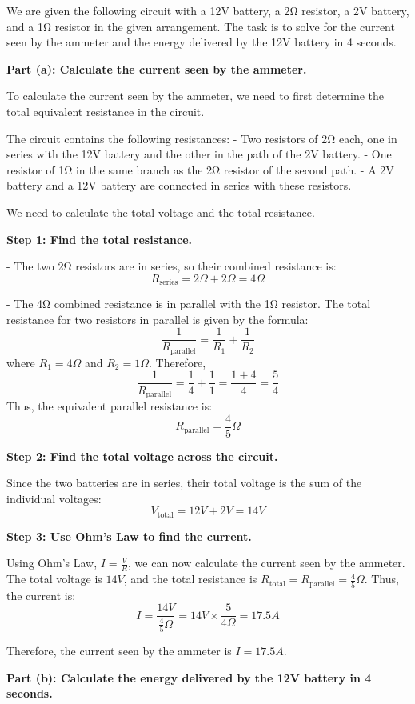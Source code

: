 \documentclass{article}
\begin{document}
We are given the following circuit with a 12V battery, a 2Ω resistor, a 2V battery, and a 1Ω resistor in the given arrangement. The task is to solve for the current seen by the ammeter and the energy delivered by the 12V battery in 4 seconds.

\textbf{Part (a): Calculate the current seen by the ammeter.}

To calculate the current seen by the ammeter, we need to first determine the total equivalent resistance in the circuit.

The circuit contains the following resistances:
- Two resistors of 2Ω each, one in series with the 12V battery and the other in the path of the 2V battery.
- One resistor of 1Ω in the same branch as the 2Ω resistor of the second path.
- A 2V battery and a 12V battery are connected in series with these resistors.

We need to calculate the total voltage and the total resistance.

\textbf{Step 1: Find the total resistance.}

- The two 2Ω resistors are in series, so their combined resistance is:
  \[
  R_{\text{series}} = 2Ω + 2Ω = 4Ω
  \]

- The 4Ω combined resistance is in parallel with the 1Ω resistor. The total resistance for two resistors in parallel is given by the formula:
  \[
  \frac{1}{R_{\text{parallel}}} = \frac{1}{R_1} + \frac{1}{R_2}
  \]
  where \(R_1 = 4Ω\) and \(R_2 = 1Ω\). Therefore,
  \[
  \frac{1}{R_{\text{parallel}}} = \frac{1}{4} + \frac{1}{1} = \frac{1 + 4}{4} = \frac{5}{4}
  \]
  Thus, the equivalent parallel resistance is:
  \[
  R_{\text{parallel}} = \frac{4}{5}Ω
  \]

\textbf{Step 2: Find the total voltage across the circuit.}

Since the two batteries are in series, their total voltage is the sum of the individual voltages:
\[
V_{\text{total}} = 12V + 2V = 14V
\]

\textbf{Step 3: Use Ohm's Law to find the current.}

Using Ohm's Law, \(I = \frac{V}{R}\), we can now calculate the current seen by the ammeter. The total voltage is \(14V\), and the total resistance is \(R_{\text{total}} = R_{\text{parallel}} = \frac{4}{5}Ω\). Thus, the current is:
\[
I = \frac{14V}{\frac{4}{5}Ω} = 14V \times \frac{5}{4Ω} = 17.5A
\]

Therefore, the current seen by the ammeter is \(I = 17.5A\).

\textbf{Part (b): Calculate the energy delivered by the 12V battery in 4 seconds.}
\end{document}
